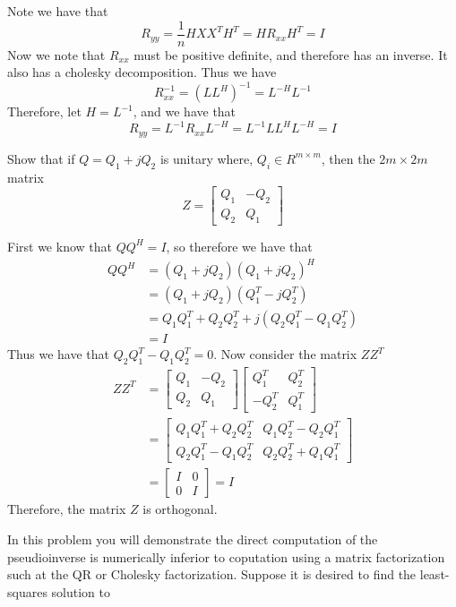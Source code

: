 \documentclass{homework}
\begin{document}
\begin{solution}
  Note we have that 
\[ R_{yy} = \frac{1}{n} HXX^TH^T = HR_{xx}H^T = I\]
  Now we note that $R_{xx}$ must be positive definite, and therefore has an inverse. It also has a cholesky decomposition. Thus we have 
  \[ R_{xx}^{-1} = (LL^H)^{-1} = L^{-H}L^{-1}\]
  Therefore, let $H = L^{-1}$, and we have that
  \[R_{yy} = L^{-1}R_{xx}L^{-H} = L^{-1}LL^{H}L^{-H} = I\]
\end{solution}

\begin{problem}[5-17]
  Show that if $Q = Q_1 + jQ_2$ is unitary where, $Q_i \in R^{m \times m}$, then the $2m \times 2m$ matrix
  \[
    Z=
    \begin{bmatrix}
      Q_1 & -Q_2 \\
      Q_2 & Q_1
    \end{bmatrix}
  \]
\end{problem}

\begin{solution}
  First we know that $QQ^H = I$, so therefore we have that
  \[
    \begin{aligned}
      QQ^H &= (Q_1 + jQ_2)(Q_1 + jQ_2)^H \\
           &= (Q_1 + jQ_2)(Q_1^T - jQ_2^T) \\
           &= Q_1Q_1^T + Q_2Q_2^T + j(Q_2Q_1^T - Q_1Q_2^T) \\ 
           &= I
    \end{aligned}
  \]
  Thus we have that $Q_2Q_1^T - Q_1Q_2^T = 0$. Now consider the matrix $ZZ^T$
  \[
    \begin{aligned}
    ZZ^T &=
    \begin{bmatrix}
      Q_1 & -Q_2 \\
      Q_2 & Q_1
    \end{bmatrix}
    \begin{bmatrix}
      Q_1^T & Q_2^T \\
      -Q_2^T & Q_1^T
    \end{bmatrix} \\
    &=
    \begin{bmatrix}
      Q_1Q_1^T + Q_2Q_2^T & Q_1Q_2^T - Q_2Q_1^T \\ 
      Q_2Q_1^T - Q_1Q_2^T & Q_2Q_2^T + Q_1Q_1^T
    \end{bmatrix} \\
    &=
    \begin{bmatrix}
      I & 0 \\ 
      0 & I
    \end{bmatrix} = I
    \end{aligned}
  \]
  Therefore, the matrix $Z$ is orthogonal.
\end{solution}

\begin{problem}[5-22]
  In this problem you will demonstrate the direct computation of the pseudioinverse is numerically inferior to coputation using a matrix factorization such at the QR or Cholesky factorization. Suppose it is desired to find the least-squares solution to 
  \[
  \]
\end{problem}
\end{document}
